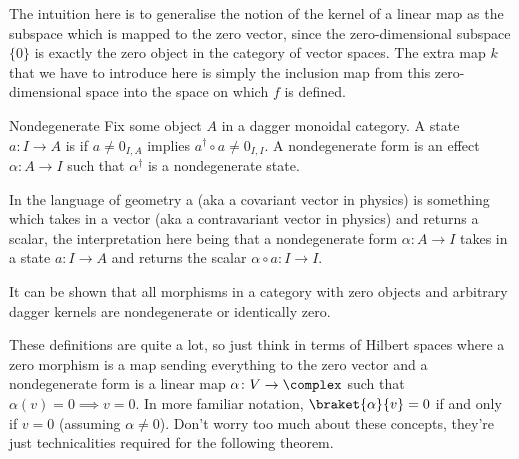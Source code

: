 \documentclass[fleqn]{NotesClass}
\begin{document}
    The intuition here is to generalise the notion of the kernel of a linear map as the subspace which is mapped to the zero vector, since the zero-dimensional subspace \(\{0\}\) is exactly the zero object in the category of vector spaces.
    The extra map \(k\) that we have to introduce here is simply the inclusion map from this zero-dimensional space into the space on which \(f\) is defined.
    
    \begin{dfn}{Nondegenerate}{}
        Fix some object \(A\) in a dagger monoidal category.
        A state \(a \colon I \to A\) is  if \(a \ne 0_{I,A}\) implies \(a^\dagger \circ a \ne 0_{I,I}\).
        A nondegenerate form is an effect \(\alpha \colon A \to I\) such that \(\alpha^\dagger\) is a nondegenerate state.
    \end{dfn}
    
    In the language of geometry a  (aka a covariant vector in physics) is something which takes in a vector (aka a contravariant vector in physics) and returns a scalar, the interpretation here being that a nondegenerate form \(\alpha \colon A \to I\) takes in a state \(a \colon I \to A\) and returns the scalar \(\alpha \circ a \colon I \to I\).
    
    It can be shown that all morphisms in a category with zero objects and arbitrary dagger kernels are nondegenerate or identically zero.
    
    These definitions are quite a lot, so just think in terms of Hilbert spaces where a zero morphism is a map sending everything to the zero vector and a nondegenerate form is a linear map \(\alpha\colon V \to \complex\) such that \(\alpha(v) = 0 \implies v = 0\).
    In more familiar notation, \(\braket{\alpha}{v} = 0\) if and only if \(v = 0\) (assuming \(\alpha \ne 0\)).
    Don't worry too much about these concepts, they're just technicalities required for the following theorem.
    
\end{document}
